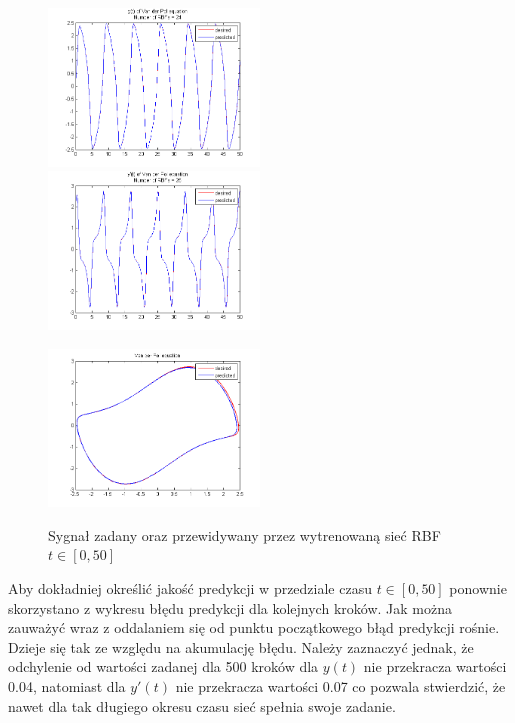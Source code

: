 \begin{figure}[ht!]
	\centering

	\subfloat
	{\includegraphics[width=0.5\textwidth]
	{images/signal_pred400.png}}
	\subfloat
	{\includegraphics[width=0.5\textwidth]
	{images/deriv_pred400.png}}	
	
	\subfloat
	{\includegraphics[width=0.5\textwidth]
	{images/trajectory_pred400.png}}

	\caption{Sygnał zadany oraz przewidywany przez wytrenowaną sieć RBF $t \in [0,50]$}
	\label{img:predicted2}
\end{figure}

Aby dokładniej określić jakość predykcji w przedziale czasu $t \in [0, 50]$ ponownie skorzystano z wykresu błędu predykcji dla kolejnych kroków. Jak można zauważyć wraz z oddalaniem się od punktu początkowego błąd predykcji rośnie. Dzieje się tak ze względu na akumulację błędu. Należy zaznaczyć jednak, że odchylenie od wartości zadanej dla 500 kroków dla $y(t)$ nie przekracza wartości 0.04, natomiast dla $y'(t)$ nie przekracza wartości 0.07 co pozwala stwierdzić, że nawet dla tak długiego okresu czasu sieć spełnia swoje zadanie.

